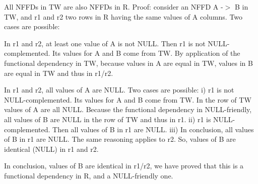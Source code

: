 All N\+F\+F\+Ds in TW are also N\+F\+F\+Ds in R. Proof\+: consider an N\+F\+FD A -\/$>$ B in TW, and r1 and r2 two rows in R having the same values of A columns. Two cases are possible\+:
\begin{DoxyItemize}
\item In r1 and r2, at least one value of A is not N\+U\+LL. Then r1 is not N\+U\+LL-\/complemented. Its values for A and B come from TW. By application of the functional dependency in TW, because values in A are equal in TW, values in B are equal in TW and thus in r1/r2.
\item In r1 and r2, all values of A are N\+U\+LL. Two cases are possible\+: i) r1 is not N\+U\+LL-\/complemented. Its values for A and B come from TW. In the row of TW values of A are all N\+U\+LL. Because the functional dependency in N\+U\+LL-\/friendly, all values of B are N\+U\+LL in the row of TW and thus in r1. ii) r1 is N\+U\+LL-\/complemented. Then all values of B in r1 are N\+U\+LL. iii) In conclusion, all values of B in r1 are N\+U\+LL. The same reasoning applies to r2. So, values of B are identical (N\+U\+LL) in r1 and r2.
\item In conclusion, values of B are identical in r1/r2, we have proved that this is a functional dependency in R, and a N\+U\+LL-\/friendly one.
\end{DoxyItemize}

